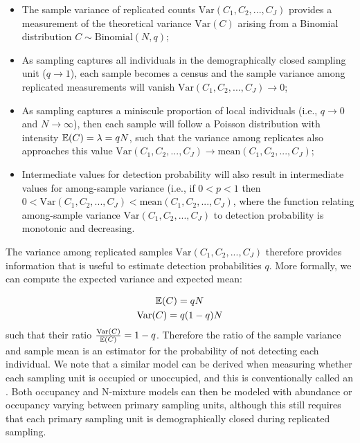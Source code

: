 \begin{itemize}
    \item The sample variance of replicated counts \( \mathrm{Var}(C_1, C_2, ..., C_J) \) provides a measurement of the theoretical variance \(\mathrm{Var}(C)\) arising from a Binomial distribution \( C \sim \mathrm{Binomial}(N,q) \);
    
    \item As sampling captures all individuals in the demographically closed sampling unit (\( q \to 1 \)), each sample becomes a census and the sample variance among replicated measurements will vanish \( \mathrm{Var}(C_1, C_2, ..., C_J) \to 0 \);  

    \item As sampling captures a miniscule proportion of local individuals (i.e., \( q \to 0 \) and \( N \to \infty \)), then each sample will follow a Poisson distribution with intensity \( \operatorname{\mathbb{E}}(C) = \lambda = qN \), such that the variance among replicates also approaches this value \( \mathrm{Var}(C_1, C_2, ..., C_J) \to \mathrm{mean}(C_1, C_2, ..., C_J) \);

    \item Intermediate values for detection probability will also result in intermediate values for among-sample variance (i.e., if \( 0 < p < 1 \) then \( 0 < \mathrm{Var}(C_1, C_2, ..., C_J) < \mathrm{mean}(C_1, C_2, ..., C_J)\), where the function relating among-sample variance \( \mathrm{Var}(C_1, C_2, ..., C_J) \) to detection probability is monotonic and decreasing.
\end{itemize}
The variance among replicated samples \( \mathrm{Var}(C_1, C_2, ..., C_J) \)  therefore provides information that is useful to estimate detection probabilities \(q\).  More formally, we can compute the expected variance and expected mean:

\begin{equation}
\begin{gathered}
   \operatorname{\mathbb{E}}(C) = qN \\
   \mathrm{Var}(C) = q(1-q)N
\end{gathered}    
\end{equation}
such that their ratio \( \frac{\mathrm{Var}(C)}{\operatorname{\mathbb{E}}(C)} = 1-q \).  Therefore the ratio of the sample variance and sample mean is an estimator for the probability of not detecting each individual.  We note that a similar model can be derived when measuring whether each sampling unit is occupied or unoccupied, and this is conventionally called an  \cite{mackenzie_occupancy_2005}.  Both occupancy and N-mixture models can then be modeled with abundance or occupancy varying between primary sampling units, although this still requires that each primary sampling unit is demographically closed during replicated sampling.  


